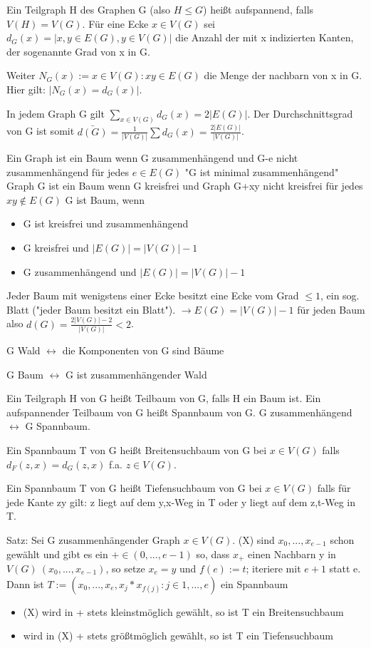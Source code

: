 \documentclass[10pt,landscape]{article}
\begin{document}
\begin{multicols}{3}
Ein Teilgraph H des Graphen G (also $H\leq G$) heißt aufspannend, falls $V(H)=V(G)$. Für eine Ecke $x\in V(G)$ sei $d_G(x)=|{x,y\in E(G), y\in V(G)}|$ die Anzahl der mit x indizierten Kanten, der sogenannte Grad von x in G.

Weiter $N_G(x):={x\in V(G): xy \in E(G)}$ die Menge der nachbarn von x in G. Hier gilt: $|N_G(x)=d_G(x)|$.

In jedem Graph G gilt $\sum_{x\in V(G)} d_G(x)=2|E(G)|$. Der Durchschnittsgrad von G ist somit $\bar{d(G)}=\frac{1}{|V(G)|}\sum d_G(x)=\frac{2|E(G)|}{|V(G)|}$.

Ein Graph ist ein Baum wenn G zusammenhängend und G-e nicht zusammenhängend für jedes $e\in E(G)$ "G ist minimal zusammenhängend"
Graph G ist ein Baum wenn G kreisfrei und Graph G+xy nicht kreisfrei für jedes $xy \not\in E(G)$
G ist Baum, wenn
\begin{itemize}
    \item G ist kreisfrei und zusammenhängend
    \item G kreisfrei und $|E(G)|=|V(G)|-1$
    \item G zusammenhängend und $|E(G)|=|V(G)|-1$
\end{itemize}

Jeder Baum mit wenigstens einer Ecke besitzt eine Ecke vom Grad $\leq 1$, ein sog. Blatt ("jeder Baum besitzt ein Blatt").
$\rightarrow E(G)=|V(G)|-1$ für jeden Baum also $d(G)=\frac{2|V(G)| -2}{|V(G)|}<2$.

G Wald $\leftrightarrow$ die Komponenten von G sind Bäume

G Baum $\leftrightarrow$ G ist zusammenhängender Wald

Ein Teilgraph H von G heißt Teilbaum von G, falls H ein Baum ist. Ein aufspannender Teilbaum von G heißt Spannbaum von G. G zusammenhängend $\leftrightarrow$ G Spannbaum.

Ein Spannbaum T von G heißt Breitensuchbaum von G bei $x\in V(G)$ falls $d_F(z,x)=d_G(z,x)$ f.a. $z\in V(G)$.

Ein Spannbaum T von G heißt Tiefensuchbaum von G bei $x\in V(G)$ falls für jede Kante zy gilt: z liegt auf dem y,x-Weg in T oder y liegt auf dem z,t-Weg in T.

Satz: Sei G zusammenhängender Graph $x\in V(G)$.
(X) sind $x_0,...,x_{e-1}$ schon gewählt und gibt es ein $+ \in (0,..., e-1)$ so, dass $x_{+}$ einen Nachbarn y in $V(G)\ (x_0,...,x_{e-1} )$, so setze $x_e=y$ und $f(e):=t$; iteriere mit $e+1$ statt e.
Dann ist $T:=({x_0,...,x_e},{x_j*x_{f(j)}: j\in {1,...,e}})$ ein Spannbaum
\begin{itemize}
    \item (X) wird in + stets kleinstmöglich gewählt, so ist T ein Breitensuchbaum
    \item wird in (X) + stets größtmöglich gewählt, so ist T ein Tiefensuchbaum
\end{itemize}


\end{multicols}
\end{document}
